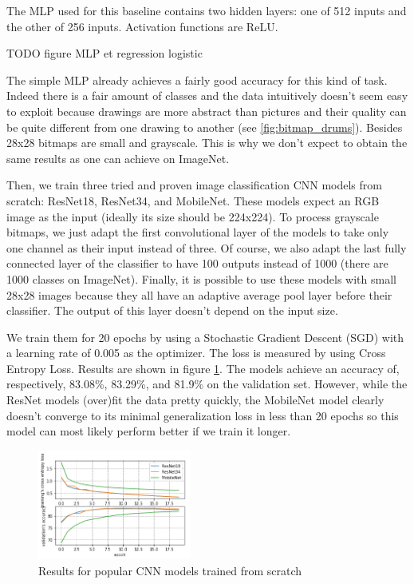 \documentclass[10pt,twocolumn,letterpaper]{article}
\begin{document}
The MLP used for this baseline contains two hidden layers: one of 512 inputs and the other of 256 inputs. Activation functions are ReLU.

TODO figure MLP et regression logistic

The simple MLP already achieves a fairly good accuracy for this kind of task. Indeed there is a fair amount of classes and the data intuitively doesn't seem easy to exploit because drawings are more abstract than pictures and their quality can be quite different from one drawing to another (see \ref{fig:bitmap_drums}). Besides 28x28 bitmaps are small and grayscale. This is why we don't expect to obtain the same results as one can achieve on ImageNet.

Then, we train three tried and proven image classification CNN models from scratch: ResNet18, ResNet34, and MobileNet. These models expect an RGB image as the input (ideally its size should be 224x224). To process grayscale bitmaps, we just adapt the first convolutional layer of the models to take only one channel as their input instead of three. Of course, we also adapt the last fully connected layer of the classifier to have 100 outputs instead of 1000 (there are 1000 classes on ImageNet). Finally, it is possible to use these models with small 28x28 images because they all have an adaptive average pool layer before their classifier. The output of this layer doesn't depend on the input size.

We train them for 20 epochs by using a Stochastic Gradient Descent (SGD) with a learning rate of 0.005 as the optimizer. The loss is measured by using Cross Entropy Loss. Results are shown in figure \ref{fig:cnn_scratch}. The models achieve an accuracy of, respectively, 83.08\%, 83.29\%, and 81.9\% on the validation set. However, while the ResNet models (over)fit the data pretty quickly, the MobileNet model clearly doesn't converge to its minimal generalization loss in less than 20 epochs so this model can most likely perform better if we train it longer.

\begin{figure}[h] 
\centering
\includegraphics[width=0.45\textwidth]{images/cnn_scratch_results.png}
\caption{Results for popular CNN models trained from scratch}
\label{fig:cnn_scratch}
\end{figure}
\end{document}
